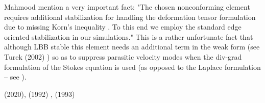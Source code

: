 Mahmood \etal \cite{maky17} mention a very important fact: "The chosen nonconforming element requires
additional stabilization for handling the deformation tensor formulation due to missing Korn's inequality 
\cite{horg95,knob00}.
To this end we employ the standard edge oriented stabilization \cite{tuos02,tuou07} in our simulations."
This is a rather unfortunate fact that although LBB stable this element needs an additional 
term in the weak form (see Turek \etal (2002) \cite{tuos02}) 
so as to suppress parasitic velocity modes when the div-grad formulation 
of the Stokes equation is used (as opposed to the Laplace formulation -- see \cite[Section 6.5.2]{dohu03}).

\Literature \textcite{shee20} (2020), \textcite{chen92} (1992) , \textcite{chen93} (1993) 







